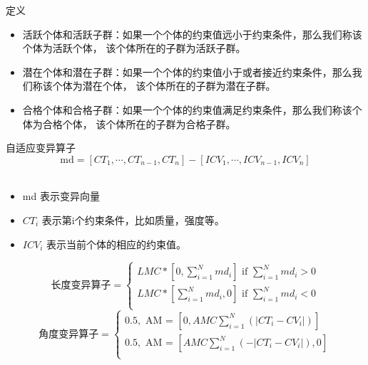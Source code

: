 \documentclass{beamer}
\begin{document}
\begin{frame}{定义}
		\begin{itemize}
			\item
				活跃个体和活跃子群：如果一个个体的约束值远小于约束条件，那么我们称该个体为活跃个体，
				该个体所在的子群为活跃子群。
			\item
				潜在个体和潜在子群：如果一个个体的约束值小于或者接近约束条件，那么我们称该个体为潜在个体，
				该个体所在的子群为潜在子群。
			\item
				合格个体和合格子群：如果一个个体的约束值满足约束条件，那么我们称该个体为合格个体，
				该个体所在的子群为合格子群。
		\end{itemize}
\end{frame}




\begin{frame}{自适应变异算子}
	\begin{equation}
		\text{md} = [CT_1, \cdots, CT_{n-1}, CT_n] -  [ICV_1, \cdots, ICV_{n-1},
		ICV_n] 
	\end{equation}
		\\
		\begin{itemize}
			\item  md 表示变异向量 
			\item  $CT_i$ 表示第i个约束条件，比如质量，强度等。
			\item  $ICV_i$ 表示当前个体的相应的约束值。
		\end{itemize}

		\begin{equation}
			\text{长度变异算子} =  
			\left\{
				\begin{array}{l}
					  LMC*[0, \sum_{i=1}^{N}{md_i}]  \text{ if $\sum_{i=1}^{N}{md_i} > 0$} \\
					  LMC*[\sum_{i=1}^{N}{md_i}, 0]  \text{ if $\sum_{i=1}^{N}{md_i} < 0$} \\
				  \end{array} 
				  \right.
		\end{equation}
		\begin{equation}
			\text{角度变异算子} = 
				\left\{
					\begin{array}{l}
					0.5, \text{ AM = }[0,AMC \sum_{i=1}^{N}{(|CT_i-CV_i|)}] \\ 
					0.5, \text{ AM = }[ AMC \sum_{i=1}^{N}{(-|CT_i-CV_i|)},0] \\
					\end{array}
					\right.
		\end{equation}
\end{frame}
\end{document}
